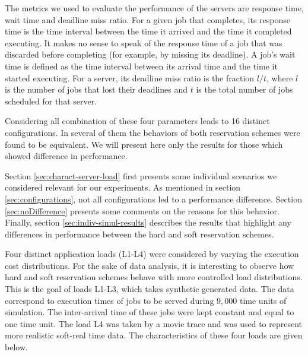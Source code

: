 \documentclass[times, 10pt,twocolumn]{article}
\begin{document}
The metrics we used to evaluate the performance of the servers are
response time, wait time and deadline miss ratio. For a given job that
completes, its response time is the time interval between the time it
arrived and the time it completed executing. It makes no sense to
speak of the response time of a job that was discarded before
completing (for example, by missing its deadline). A job's wait time
is defined as the time interval between its arrival time and the time
it started executing. For a server, its deadline miss ratio is the
fraction $l/t$, where $l$ is the number of jobs that lost their
deadlines and $t$ is the total number of jobs scheduled for that
server.

Considering all combination of these four parameters leads to 16
distinct configurations. In several of them the behaviors of both
reservation schemes were found to be equivalent.  We will present here
only the results for those which showed difference in performance.

\label{sec:simulation-results}

Section \ref{sec:charact-server-load} first presents some individual
scenarios we considered relevant for our experiments. As mentioned in
section \ref{sec:configurations}, not all configurations led to a
performance difference. Section \ref{sec:noDifference} presents some
comments on the reasons for this behavior. Finally, section
\ref{sec:indiv-simul-results} describes the results that highlight any
differences in performance between the hard and soft reservation
schemes.

\label{sec:charact-server-load}

Four distinct application loads (L1-L4) were considered by varying the
execution cost distributions.  For the sake of data analysis, it is
interesting to observe how hard and soft reservation schemes behave
with more controlled load distributions. This is the goal of loads
L1-L3, which takes synthetic generated data. The data correspond to
execution times of jobs to be served during $9,000$ time units of
simulation.  The inter-arrival time of these jobs were kept constant
and equal to one time unit.  The load L4 was taken by a movie trace
and was used to represent more realistic soft-real time data. The
characteristics of these four loads are given below.
\end{document}
